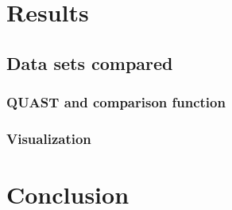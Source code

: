 \documentclass[10pt, twocolumn]{article}
\begin{document}
\section{Results}
\subsection{Data sets compared}
\subsubsection{QUAST and comparison function}
\subsubsection{Visualization}
\section{Conclusion}
\clearpage




\end{document}
